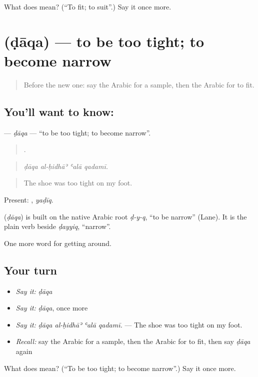 \begin{tcolorbox}[breakable,colback=teal!4,colframe=teal!35!black,title={Before you move on}]
What does  mean? (\textquotedblleft{}To fit; to suit\textquotedblright{}.) Say it once more.
\end{tcolorbox}
\section[\texorpdfstring{\ar{ضاق} (ḍāqa)}{ضاق (ḍāqa)}]{ (ḍāqa) — to be too tight; to become narrow}

\label{lesson:AR-C456-daqa}



\begin{quote}
Before the new one: say the Arabic for a sample, then the Arabic for to fit.
\end{quote}

\subsection*{You'll want to know: }
\textbf{} — \emph{ḍāqa} — \textquotedblleft{}to be too tight; to become narrow\textquotedblright{}.

\begin{quote}
   .
\end{quote}

\begin{quote}
\emph{ḍāqa al-ḥidhāʾ ʿalā qadamī.}
\end{quote}

\begin{quote}
The shoe was too tight on my foot.
\end{quote}

Present: , \emph{yaḍīq}.

\begin{cousinweb}
\textbf{} (\emph{ḍāqa}) is built on the native Arabic root \emph{ḍ-y-q}, \textquotedblleft{}to be narrow\textquotedblright{} (Lane). It is the plain verb beside \emph{ḍayyiq}, \textquotedblleft{}narrow\textquotedblright{}.
\end{cousinweb}

\begin{grammarlens}[title={What you've built}]
One more word for getting around.
\end{grammarlens}

\subsection*{Your turn}
\begin{itemize}
\raggedright
  \item \emph{Say it:} \emph{ḍāqa}
  \item \emph{Say it:} \emph{ḍāqa}, once more
  \item \emph{Say it:} \emph{ḍāqa al-ḥidhāʾ ʿalā qadamī.} — The shoe was too tight on my foot.
  \item \emph{Recall:} say the Arabic for a sample, then the Arabic for to fit, then say \emph{ḍāqa} again
\end{itemize}

\begin{tcolorbox}[breakable,colback=teal!4,colframe=teal!35!black,title={Before you move on}]
What does  mean? (\textquotedblleft{}To be too tight; to become narrow\textquotedblright{}.) Say it once more.
\end{tcolorbox}
